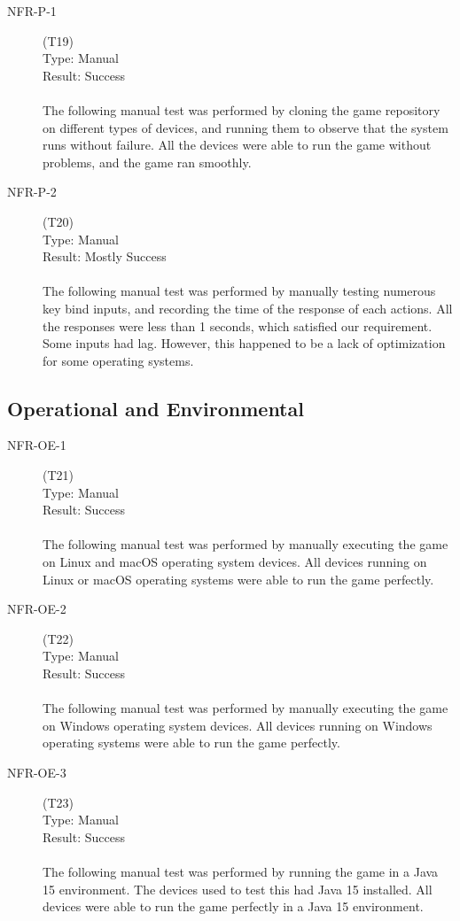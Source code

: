 \documentclass[12pt, titlepage]{article}
\begin{document}
\begin{description}
    \item[NFR-P-1] (T19)\\
    Type: Manual\\
    Result: Success\\
    \\
    The following manual test was performed by cloning the game repository on different types of devices, and running them to observe that the system runs without failure. All the devices were able to run the game without problems, and the game ran smoothly.

    \item[NFR-P-2] (T20)\\
    Type: Manual\\
    Result: Mostly Success\\
    \\
    The following manual test was performed by manually testing numerous key bind inputs, and recording the time of the response of each actions. All the responses were less than 1 seconds, which satisfied our requirement. Some inputs had lag. However, this happened to be a lack of optimization for some operating systems.

\end{description}

\subsection{Operational and Environmental}

\begin{description}
    \item[NFR-OE-1] (T21)\\
    Type: Manual\\
    Result: Success\\
    \\
    The following manual test was performed by manually executing the game on Linux and macOS operating system devices. All devices running on Linux or macOS operating systems were able to run the game perfectly.

    \item[NFR-OE-2] (T22)\\
    Type: Manual\\
    Result: Success\\
    \\
    The following manual test was performed by manually executing the game on Windows operating system devices. All devices running on Windows operating systems were able to run the game perfectly.

    \item[NFR-OE-3] (T23)\\
    Type: Manual\\
    Result: Success\\
    \\
    The following manual test was performed by running the game in a Java 15 environment. The devices used to test this had Java 15 installed. All devices were able to run the game perfectly in a Java 15 environment.

\end{description}
\end{document}
